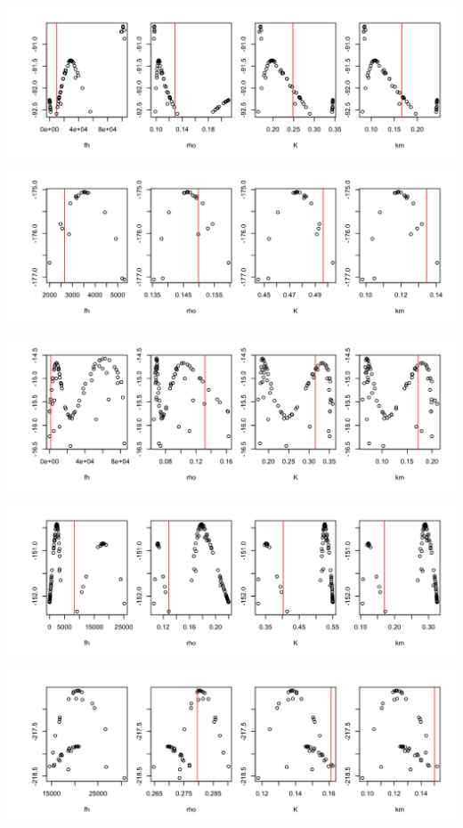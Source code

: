\documentclass[12pt,reqno,final,pdftex]{amsart}\usepackage[]{graphicx}\usepackage[]{color}
\newenvironment{knitrout}{}{} %
\theoremstyle{plain}
\numberwithin{equation}{part}
\begin{document}
\begin{knitrout}
\includegraphics[width=\linewidth]{figure/unnamed-chunk-4-10} \hfill{}




\includegraphics[width=\linewidth]{figure/unnamed-chunk-4-11} \hfill{}




\includegraphics[width=\linewidth]{figure/unnamed-chunk-4-12} \hfill{}




\includegraphics[width=\linewidth]{figure/unnamed-chunk-4-13} \hfill{}




\includegraphics[width=\linewidth]{figure/unnamed-chunk-4-14} \hfill{}





\end{knitrout}
\end{document}
